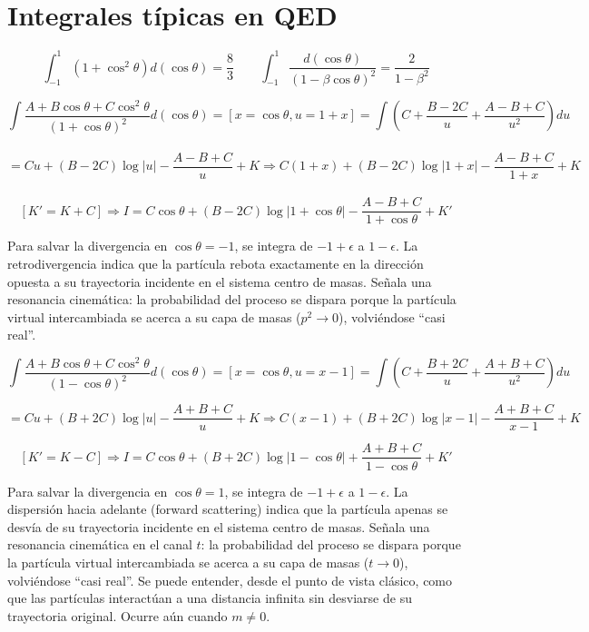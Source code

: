 \newcolumn  

\section{Integrales típicas en QED}

$$\int_{-1}^{1} \left( 1 + \cos^2\theta \right) d(\cos\theta) = \frac{8}{3}  \quad 
\quad \int_{-1}^{1} \frac{d(\cos\theta)}{(1 - \beta\cos\theta)^2} = \frac{2}{1-\beta^2}$$



$$\int \frac{A + B\cos\theta + C\cos^2\theta}{(1 + \cos\theta)^2} d(\cos\theta)\! =\!  [x\! =\! \cos \theta, u \!=\! 1+x ] \!=\! \int \left( C + \frac{B - 2C}{u} + \frac{A - B + C}{u^2} \right) du $$\\
$$= Cu + (B - 2C)\log|u| - \frac{A - B + C}{u} + K \Rightarrow C(1+x) + (B - 2C)\log|1+x| - \frac{A - B + C}{1+x} + K$$\\
$$[K' = K + C]  \Rightarrow  I = C\cos\theta + (B - 2C)\log|1+\cos\theta| - \frac{A - B + C}{1+\cos\theta} + K'$$


Para salvar la divergencia en $\cos \theta =-1$, se integra de $-1 + \epsilon $ a $1- \epsilon$. La retrodivergencia indica que la partícula rebota exactamente en la dirección opuesta a su trayectoria incidente en el sistema centro de masas. Señala una resonancia cinemática: la probabilidad del proceso se dispara porque la partícula virtual intercambiada se acerca a su capa de masas ($p^2 \to 0$), volviéndose ``casi real''.





$$\int \frac{A + B\cos\theta + C\cos^2\theta}{(1 - \cos\theta)^2} d(\cos\theta)\! =\! [x\! =\! \cos \theta, u \!=\! x-1 ] \!=\! \int \left( C + \frac{B + 2C}{u} + \frac{A + B + C}{u^2} \right) du $$

$$= Cu + (B + 2C)\log|u| - \frac{A + B + C}{u} + K \Rightarrow C(x-1) + (B + 2C)\log|x-1| - \frac{A + B + C}{x-1} + K$$

$$[K' = K - C] \Rightarrow I = C\cos\theta + (B + 2C)\log|1-\cos\theta| + \frac{A + B + C}{1-\cos\theta} + K'$$


Para salvar la divergencia en $\cos \theta = 1$, se integra de $-1 + \epsilon$ a $1 - \epsilon$. La dispersión hacia adelante (forward scattering) indica que la partícula apenas se desvía de su trayectoria incidente en el sistema centro de masas. Señala una resonancia cinemática en el canal $t$: la probabilidad del proceso se dispara porque la partícula virtual intercambiada se acerca a su capa de masas ($t \to 0$), volviéndose ``casi real''. Se puede entender, desde el punto de vista clásico, como que las partículas interactúan a una distancia infinita sin desviarse de su trayectoria original. Ocurre aún cuando $m\neq 0$. 

